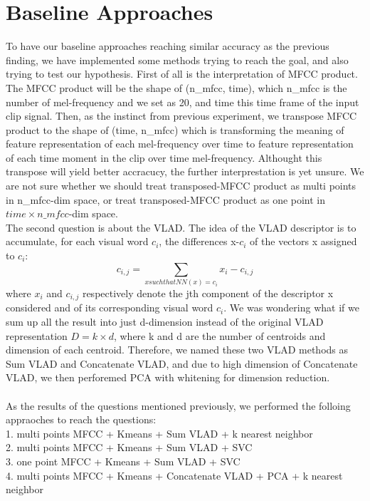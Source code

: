 \documentclass[final]{siamltexmm}
\begin{document}
\section{Baseline Approaches}
To have our baseline approaches reaching similar accuracy as the previous finding, we have implemented some methods trying to reach the goal, and also trying to test our hypothesis. First of all is the interpretation of MFCC product. The MFCC product will be the shape of (n\_mfcc, time), which n\_mfcc is the number of mel-frequency and we set as 20, and time this time frame of the input clip signal. Then, as the instinct from previous experiment, we transpose MFCC product to the shape of (time, n\_mfcc) which is transforming the meaning of feature representation of each mel-frequency over time to feature representation of each time moment in the clip over time mel-frequency. Althought this transpose will yield better accracucy, the further interprestation is yet unsure. We are not sure whether we should treat transposed-MFCC product as multi points in n\_mfcc-dim space, or treat transposed-MFCC product as one point in $time \times n\_mfcc$-dim space.
\\The second question is about the VLAD. The idea of the VLAD descriptor is to accumulate, for each visual word $c_{i}$, the differences x-$c_{i}$ of the vectors x assigned to $c_{i}$:
\begin{equation}
c_{i, j} = \sum\limits_{x such that NN(x)=c_{i}} x_{i}-c_{i,j}
\end{equation}
where $x_{i}$ and $c_{i,j}$ respectively denote the jth component of the descriptor x considered and of its corresponding visual word $c_{i}$. We was wondering what if we sum up all the result into just d-dimension instead of the original VLAD representation $D=k\times d$, where k and d are the number of centroids and dimension of each centroid. Therefore, we named these two VLAD methods as Sum VLAD and Concatenate VLAD, and due to high dimension of Concatenate VLAD, we then perforemed PCA with whitening for dimension reduction.
\\\\As the results of the questions mentioned previously, we performed the folloing appraoches to reach the questions:
\\ 1. multi points MFCC + Kmeans + Sum VLAD + k nearest neighbor
\\ 2. multi points MFCC + Kmeans + Sum VLAD + SVC
\\ 3. one point MFCC + Kmeans + Sum VLAD + SVC
\\ 4. multi points MFCC + Kmeans + Concatenate VLAD + PCA + k nearest neighbor
\end{document}
